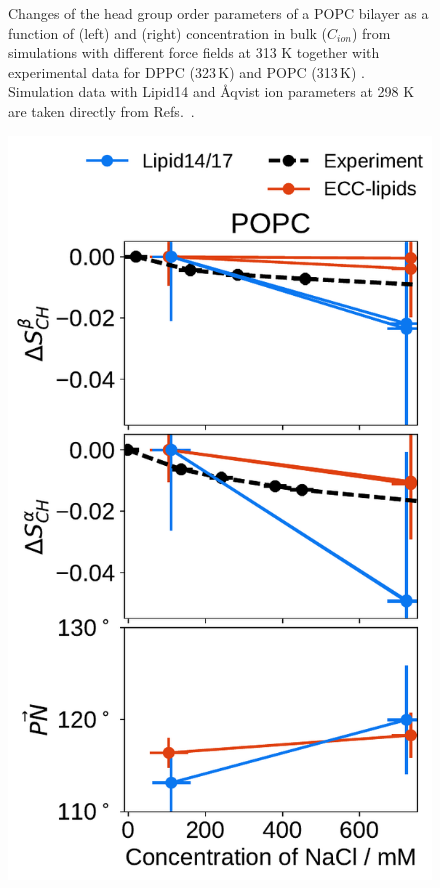 \begin{figure}[htb!]
  \caption{\label{fig:delta_ordPar_NaCl} 
    Changes of the head group order parameters of a POPC bilayer as a function of  (left) and  (right) concentration 
    in bulk ($C_{ion}$) from simulations with different force fields at 313 K together with  
    experimental data for DPPC (323\,K) \citep{akutsu81} and POPC (313\,K) \citep{altenbach84}. 
    Simulation data with Lipid14 and Åqvist ion parameters at 298 K are taken directly from 
    Refs.~\citep{lipid14POPC0mMNaClfiles,lipid14POPC1000mMNaClfiles}. 
  } 
\end{figure} 
 

 
\begin{figure}[tbp!] 
  \centering 
  \includegraphics[width=\figwidthsmall]{../img/ecc_pops/order_parameters_changes_ecc-lip_L14_A-B-PN-COO_POPC_nacl.pdf} 

\end{figure}
